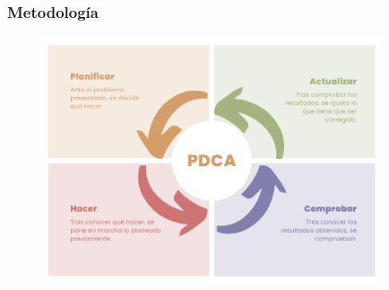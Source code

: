 \documentclass{beamer}
\begin{document}
\begin{frame}
	\frametitle{Metodología}
	\begin{figure}
		\centering
		\includegraphics[width=10cm]{figs/PDCA.png}
	\end{figure}
	
\end{frame}
\end{document}
